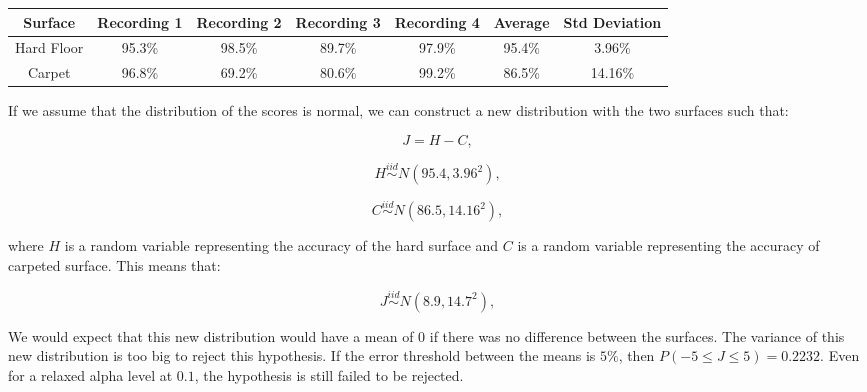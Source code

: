                 \begin{center}
                    \label{tbl_surface_results}
                    \begin{tabular}{|c|c|c|c|c||c|c|}
                        \hline
                        Surface & Recording 1 & Recording 2 & Recording 3 & Recording 4 & Average & Std Deviation\\
                        \hline
                        Hard Floor & 95.3\% & 98.5\% & 89.7\% & 97.9\% & 95.4\% & 3.96\%\\
                        Carpet & 96.8\% & 69.2\% & 80.6\% & 99.2\% & 86.5\% & 14.16\%\\
                        \hline
                    \end{tabular}
                \end{center}

                If we assume that the distribution of the scores is normal, we can construct a new distribution with the two surfaces such that:

                \begin{equation}
                    J = H - C,
                \end{equation}

                \begin{equation}
                    H \overset{iid}{\sim} N(95.4, 3.96^2),
                \end{equation}

                \begin{equation}
                    C \overset{iid}{\sim} N(86.5, 14.16^2),
                \end{equation}

                where $H$ is a random variable representing the accuracy of the hard surface and $C$ is a random variable representing the accuracy of carpeted surface. This means that:

                \begin{equation}
                    J \overset{iid}{\sim} N(8.9, 14.7^2),
                \end{equation}

                We would expect that this new distribution would have a mean of 0 if there was no difference between the surfaces. The variance of this new distribution is too big to reject this hypothesis. If the error threshold between the means is $5\%$, then $P(-5 \leq J \leq 5) = 0.2232$. Even for a relaxed alpha level at $0.1$, the hypothesis is still failed to be rejected.

